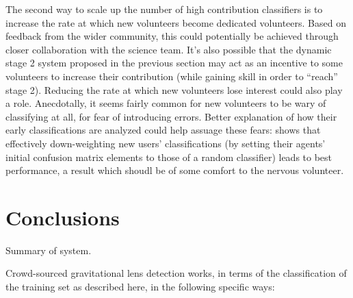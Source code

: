 \documentclass[useAMS,usenatbib,a4paper]{mn2e}
\begin{document}
The second way to scale up the number of high contribution classifiers is to
increase the rate at which new volunteers become dedicated volunteers. Based
on feedback from the wider \sw community, this could potentially be achieved
through closer collaboration with the science team. It's also possible that
the dynamic stage 2 system proposed in the previous section may act as an
incentive to some volunteers to increase their contribution (while gaining
skill in order to ``reach'' stage 2). Reducing the rate at which  new
volunteers lose interest could also play a role. Anecdotally, it seems fairly
common for new volunteers to be wary of classifying at all, for fear of
introducing errors. Better explanation of how their early classifications are
analyzed could help assuage these fears:  shows that
effectively down-weighting new users' classifications (by setting their
agents' initial confusion matrix elements to those of a random classifier)
leads to best performance, a result which shoudl be of some comfort to the
nervous volunteer. 




\section{Conclusions}
\label{sec:conclude}


Summary of system.

Crowd-sourced gravitational lens detection works, in terms of the
classification of the training set as described here, in the following
specific ways: 
\end{document}
